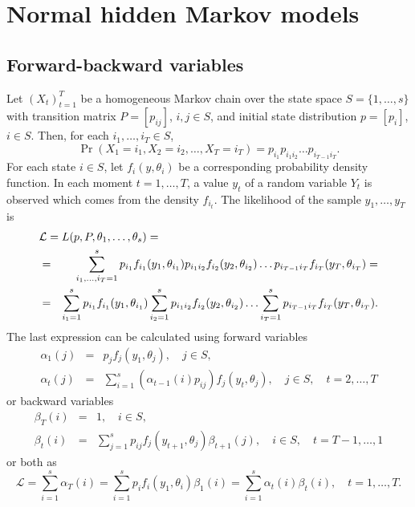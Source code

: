 \chapter{Normal hidden Markov models}

\section{Forward-backward variables}

Let $(X_t)_{t = 1}^T$ be a homogeneous Markov chain over the state
space $S = \{1, \ldots, s\}$ with transition matrix $P = [p_{ij}]$,
$i, j \in S$, and initial state distribution $p = [p_i]$, $i \in S$.
Then, for each $i_1, \ldots, i_T \in S$,
\[
\Pr(X_1 = i_1, X_2 = i_2, \ldots, X_T = i_T) = p_{i_1}p_{i_1i_2}
\ldots p_{i_{T - 1}i_T}.
\]
For each state $i \in S$, let $f_i(y, \theta_i)$ be a corresponding
probability density function. In each moment $t = 1, \ldots, T$, a
value $y_t$ of a random variable $Y_t$ is observed which comes from
the density $f_{i_t}$. The likelihood of the sample $y_1, \ldots, y_T$
is
\begin{eqnarray*}
  \lefteqn{\mathcal{L} = L(p, P, \theta_1, \ldots, \theta_s) =} \\ & =
  & \sum_{i_1, \ldots, i_T = 1}^s p_{i_1}f_{i_1}(y_1, \theta_{i_1})
  p_{i_1i_2}f_{i_2}(y_2, \theta_{i_2}) \ldots p_{i_{T - 1}i_T}
  f_{i_T}(y_T, \theta_{i_T}) = \\ & = & \sum_{i_1 = 1}^s
  p_{i_1}f_{i_1}(y_1, \theta_{i_1}) \sum_{i_2 = 1}^s
  p_{i_1i_2}f_{i_2}(y_2, \theta_{i_2}) \ldots \sum_{i_T = 1}^s p_{i_{T
      - 1}i_T}f_{i_T}(y_T, \theta_{i_T}).
\end{eqnarray*}
The last expression can be calculated using forward variables
\begin{eqnarray}
  \label{eq:alpha1}
  \alpha_1(j) & = & p_j f_j(y_1, \theta_j), \hspace{1em} j \in S, \\
  \label{eq:alphat}
  \alpha_t(j) & = & \sum_{i = 1}^s (\alpha_{t - 1}(i)p_{ij})
  f_j(y_t, \theta_j),
  \hspace{1em} j\in S, \hspace{1em} t = 2, \ldots, T
\end{eqnarray}
or backward variables
\begin{eqnarray}
  \label{eq:betaT}
  \beta_T(i) & = & 1, \hspace{1em} i \in S, \\
  \label{eq:betat}
  \beta_t(i) & = & \sum_{j = 1}^s p_{ij}f_j(y_{t + 1},
  \theta_j)\beta_{t + 1}(j),
  \hspace{1em} i \in S, \hspace{1em} t = T - 1, \ldots, 1
\end{eqnarray}
or both as
\begin{equation}
  \label{eq:likelihood}
  \mathcal{L} = \sum_{i = 1}^s \alpha_T(i) = \sum_{i = 1}^s p_i f_i(y_1,
  \theta_i) \beta_1(i) = \sum_{i = 1}^s
  \alpha_t(i)\beta_t(i), \hspace{1em} t = 1, \ldots, T.
\end{equation}

